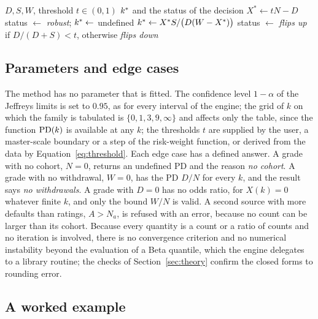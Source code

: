 \begin{algorithm}[htbp]
\caption{Tipping odds ratio of a decision at a threshold, and its status.}
\label{alg:tipping}
\begin{algorithmic}[1]
\Require $D,S,W$, threshold $t\in(0,1)$
\Ensure $k^{*}$ and the status of the decision
\State $X^{\ast}\gets tN-D$
  \State status $\gets$ \emph{robust}; $k^{*}\gets$ undefined
\Else
  \State $k^{*}\gets X^{\ast}S/\big(D(W-X^{\ast})\big)$
  \State status $\gets$ \emph{flips up} if $D/(D+S)<t$, otherwise \emph{flips down}
\EndIf
\end{algorithmic}
\end{algorithm}

\subsection{Parameters and edge cases}

The method has no parameter that is fitted. The confidence level $1-\alpha$ of the Jeffreys limits is set to $0.95$, as for every interval of the engine; the grid of $k$ on which the family is tabulated is $\{0,1,3,9,\infty\}$ and affects only the table, since the function $\mathrm{PD}(k)$ is available at any $k$; the thresholds $t$ are supplied by the user, a master-scale boundary or a step of the risk-weight function, or derived from the data by Equation~\eqref{eq:threshold}. Each edge case has a defined answer. A grade with no cohort, $N=0$, returns an undefined PD and the reason \emph{no cohort}. A grade with no withdrawal, $W=0$, has the PD $D/N$ for every $k$, and the result says \emph{no withdrawals}. A grade with $D=0$ has no odds ratio, for $X(k)=0$ whatever finite $k$, and only the bound $W/N$ is valid. A second source with more defaults than ratings, $A>N_a$, is refused with an error, because no count can be larger than its cohort. Because every quantity is a count or a ratio of counts and no iteration is involved, there is no convergence criterion and no numerical instability beyond the evaluation of a Beta quantile, which the engine delegates to a library routine; the checks of Section~\ref{sec:theory} confirm the closed forms to rounding error.

\subsection{A worked example}

